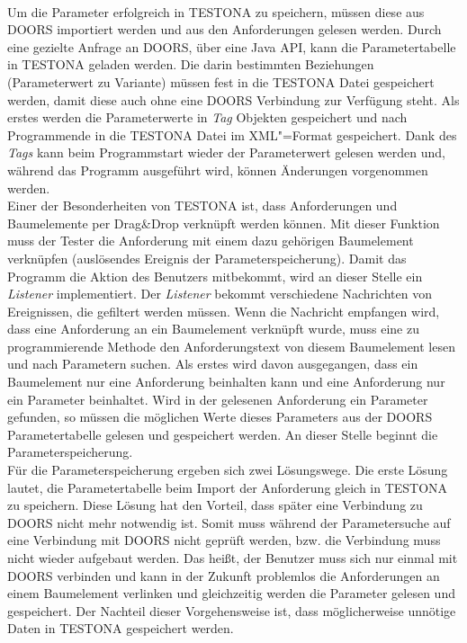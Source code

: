 \paragraph{}
 
Um die Parameter erfolgreich in TESTONA zu speichern, müssen diese aus DOORS importiert werden und aus den Anforderungen gelesen werden. Durch eine gezielte Anfrage an DOORS, über eine Java API, kann die Parametertabelle in TESTONA geladen werden. Die darin bestimmten Beziehungen (Parameterwert zu Variante) müssen fest in die TESTONA Datei gespeichert werden, damit diese auch ohne eine DOORS Verbindung zur Verfügung steht. Als erstes werden die Parameterwerte in \textit{Tag} Objekten gespeichert und nach Programmende in die TESTONA Datei im XML"=Format gespeichert. Dank des \textit{Tags} kann beim Programmstart wieder der Parameterwert gelesen werden und, während das Programm ausgeführt wird, können Änderungen vorgenommen werden.\\


Einer der Besonderheiten von TESTONA ist, dass Anforderungen und Baumelemente per Drag\&Drop verknüpft werden können. Mit dieser Funktion muss der Tester die Anforderung mit einem dazu gehörigen Baumelement verknüpfen (auslösendes Ereignis der Parameterspeicherung). Damit das Programm die Aktion des Benutzers mitbekommt, wird an dieser Stelle ein \textit{Listener} implementiert. Der \textit{Listener} bekommt verschiedene Nachrichten von Ereignissen, die gefiltert werden müssen. Wenn die Nachricht empfangen wird, dass eine Anforderung an ein Baumelement verknüpft wurde, muss eine zu programmierende Methode den Anforderungstext von diesem Baumelement lesen und nach Parametern suchen. Als erstes wird davon ausgegangen, dass ein Baumelement nur eine Anforderung beinhalten kann und eine Anforderung nur ein Parameter beinhaltet. Wird in der gelesenen Anforderung ein Parameter gefunden, so müssen die möglichen Werte dieses Parameters aus der DOORS Parametertabelle gelesen und gespeichert werden. An dieser Stelle beginnt die Parameterspeicherung.\\


Für die Parameterspeicherung ergeben sich zwei Lösungswege. Die erste Lösung lautet, die Parametertabelle beim Import der Anforderung gleich in TESTONA zu speichern. Diese Lösung hat den Vorteil, dass später eine Verbindung zu DOORS nicht mehr notwendig ist. Somit muss während der Parametersuche auf eine Verbindung mit DOORS nicht geprüft werden, bzw. die Verbindung muss nicht wieder aufgebaut werden. Das heißt, der Benutzer muss sich nur einmal mit DOORS verbinden und kann in der Zukunft problemlos die Anforderungen an einem Baumelement verlinken und gleichzeitig werden die Parameter gelesen und gespeichert. Der Nachteil dieser Vorgehensweise ist, dass möglicherweise unnötige Daten in TESTONA gespeichert werden.\\


